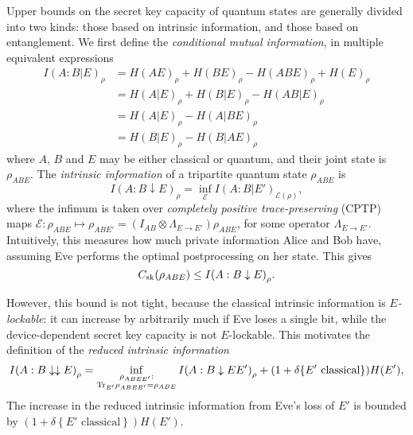 \documentclass[10pt, a4paper]{article}
\numberwithin{equation}{section} %
\theoremstyle{definition}
\theoremstyle{plain}
\newcommand{\?}{\mathrel{?}} %
\newcommand{\indic}[1]{\delta{\left\{#1\right\}}} %
\newcommand{\Tr}{\mathrm{Tr}} %
\newcommand{\cE}{\mathcal{E}}
\newcommand{\sk}{\rm sk}
\begin{document}
      Upper bounds on the secret key capacity of quantum states are generally divided into two kinds: those based on intrinsic information, and those based on entanglement. We first define the \emph{conditional mutual information}, in multiple equivalent expressions
      \begin{align}
        I{(A:B|E)}_{\rho} &= H{(AE)}_{\rho} + H{(BE)}_{\rho} - H{(ABE)}_{\rho} + H{(E)}_{\rho} \\
                          &= H{(A|E)}_{\rho} + H{(B|E)}_{\rho} - H{(AB|E)}_{\rho} \\
                          &= H{(A|E)}_{\rho} - H{(A|BE)}_{\rho} \\
                          &= H{(B|E)}_{\rho} - H{(B|AE)}_{\rho}
      \end{align}
      where \(A\), \(B\) and \(E\) may be either classical or quantum, and their joint state is \(\rho_{ABE}\). The \emph{intrinsic information} of a tripartite quantum state \(\rho_{A B E}\) is
      \begin{equation}
        I{(A : B \downarrow E)}_{\rho} = \inf_{\cE} I{(A : B|E')}_{\cE(\rho)},
      \end{equation}
      where the infimum is taken over \emph{completely positive trace-preserving} (CPTP) maps \(\cE : \rho_{A B E} \mapsto \rho_{A B E'} = \left(I_{A B} \otimes \Lambda_{E \to E'}\right) \rho_{A B E}\), for some operator \(\Lambda_{E \to E'}\). Intuitively, this measures how much private information Alice and Bob have, assuming Eve performs the optimal postprocessing on her state. This gives
      \begin{equation}
        C_{\sk}(\rho_{A B E}) \leq I{(A : B \downarrow E)}_{\rho}.
      \end{equation}

      However, this bound is not tight, because the classical intrinsic information is \emph{\(E\)-lockable}: it can increase by arbitrarily much if Eve loses a single bit, while the device-dependent secret key capacity is not \(E\)-lockable. This motivates the definition of the \emph{reduced intrinsic information}
      \begin{equation}\label{eqn:red_intr_info}
        I{(A : B \downarrow\downarrow E)}_{\rho} = \inf_{%
        \substack{\rho_{A B EE'} : \\ 
        \Tr_{E'} \rho_{A B EE'} = \rho_{A B E}}}
        I{(A : B \downarrow EE')}_{\rho} + (1+\indic{E' \text{ classical}})H(E'),
      \end{equation}
      The increase in the reduced intrinsic information from Eve's loss of \(E'\) is bounded by \((1+\indic{E' \text{ classical}})H(E')\).
\end{document}
